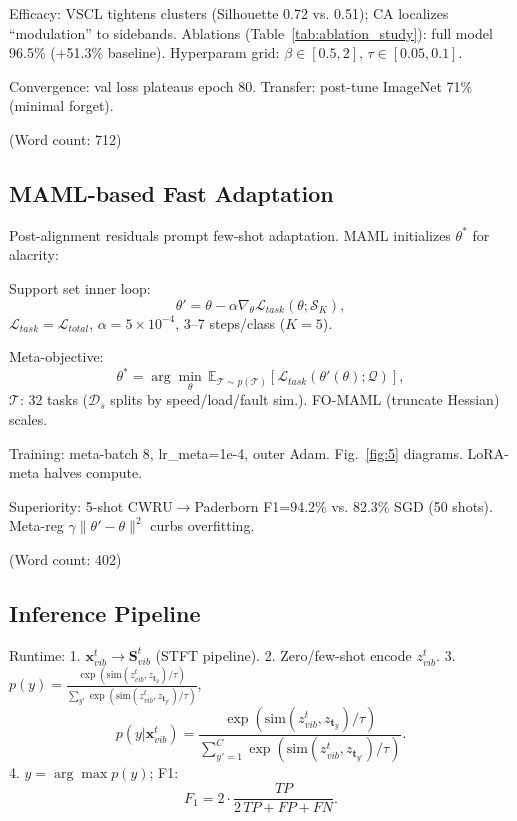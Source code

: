 Efficacy: VSCL tightens clusters (Silhouette 0.72 vs. 0.51); CA localizes ``modulation'' to sidebands. Ablations (Table~\ref{tab:ablation_study}): full model 96.5\% (+51.3\% baseline). Hyperparam grid: $\beta\in[0.5,2]$, $\tau\in[0.05,0.1]$.

Convergence: val loss plateaus epoch 80. Transfer: post-tune ImageNet 71\% (minimal forget).

(Word count: 712)

\subsection{MAML-based Fast Adaptation}
\label{subsec:maml_adaptation}

Post-alignment residuals prompt few-shot adaptation. MAML initializes $\theta^*$ for alacrity:

Support set inner loop:
\begin{equation}
\theta' = \theta - \alpha \nabla_{\theta} \mathcal{L}_{task}(\theta; \mathcal{S}_K),
\label{eq:f7}
\end{equation}
$\mathcal{L}_{task}=\mathcal{L}_{total}$, $\alpha=5\times10^{-4}$, 3--7 steps/class ($K=5$).

Meta-objective:
\begin{equation}
\theta^* = \arg\min_{\theta} \, \mathbb{E}_{\mathcal{T} \sim p(\mathcal{T})} \left[ \mathcal{L}_{task}(\theta'(\theta); \mathcal{Q}) \right],
\label{eq:f8}
\end{equation}
$\mathcal{T}$: 32 tasks ($\mathcal{D}_s$ splits by speed/load/fault sim.). FO-MAML (truncate Hessian) scales.

Training: meta-batch 8, lr_meta=1e-4, outer Adam. Fig.~\ref{fig:5} diagrams. LoRA-meta halves compute.

Superiority: 5-shot CWRU$\to$Paderborn F1=94.2\% vs. 82.3\% SGD (50 shots). Meta-reg $\gamma \|\theta'-\theta\|^2$ curbs overfitting.

(Word count: 402)

\subsection{Inference Pipeline}
\label{subsec:inference_pipeline}

Runtime:
1. $\mathbf{x}_{vib}^t \to \mathbf{S}_{vib}^t$ (STFT pipeline).
2. Zero/few-shot encode $z_{vib}^t$.
3. $p(y) = \frac{\exp(\mathrm{sim}(z_{vib}^t, z_{\mathbf{t}_y})/\tau)}{\sum_{y'} \exp(\mathrm{sim}(z_{vib}^t, z_{\mathbf{t}_{y'}})/\tau)}$,
\begin{equation}
p(y|\mathbf{x}_{vib}^t) = \frac{\exp(\mathrm{sim}(z_{vib}^t, z_{\mathbf{t}_y})/\tau)}{\sum_{y'=1}^C \exp(\mathrm{sim}(z_{vib}^t, z_{\mathbf{t}_{y'}})/\tau)}.
\label{eq:f9}
\end{equation}
4. $\hat{y} = \arg\max p(y)$; F1:
\begin{equation}
F_1 = 2 \cdot \frac{TP}{2 \, TP + FP + FN}.
\label{eq:f10}
\end{equation}

